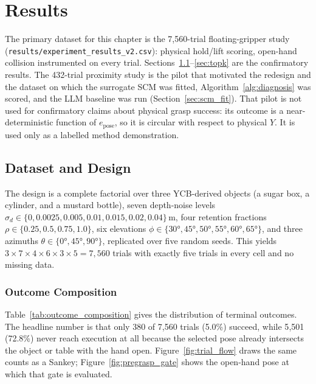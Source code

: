 \documentclass[11pt,a4paper]{report}
\begin{document}
\chapter{Results}
\label{ch:results}

The primary dataset for this chapter is the 7{,}560-trial floating-gripper study (\texttt{results/experiment\_results\_v2.csv}): physical hold/lift scoring, open-hand collision instrumented on every trial. Sections~\ref{sec:descriptive}--\ref{sec:topk} are the confirmatory results. The 432-trial proximity study is the pilot that motivated the redesign and the dataset on which the surrogate SCM was fitted, Algorithm~\ref{alg:diagnosis} was scored, and the LLM baseline was run (Section~\ref{sec:scm_fit}). That pilot is not used for confirmatory claims about physical grasp success: its outcome is a near-deterministic function of $e_{\text{pose}}$, so it is circular with respect to physical $Y$. It is used only as a labelled method demonstration.

\section{Dataset and Design}
\label{sec:descriptive}

The design is a complete factorial over three YCB-derived objects (a sugar box, a cylinder, and a mustard bottle), seven depth-noise levels $\sigma_d \in \{0, 0.0025, 0.005, 0.01, 0.015, 0.02, 0.04\}$\,m, four retention fractions $\rho \in \{0.25, 0.5, 0.75, 1.0\}$, six elevations $\phi \in \{30°, 45°, 50°, 55°, 60°, 65°\}$, and three azimuths $\theta \in \{0°, 45°, 90°\}$, replicated over five random seeds. This yields $3 \times 7 \times 4 \times 6 \times 3 \times 5 = 7{,}560$ trials with exactly five trials in every cell and no missing data.

\subsection{Outcome Composition}

Table~\ref{tab:outcome_composition} gives the distribution of terminal outcomes. The headline number is that only 380 of 7{,}560 trials (5.0\%) succeed, while 5{,}501 (72.8\%) never reach execution at all because the selected pose already intersects the object or table with the hand open. Figure~\ref{fig:trial_flow} draws the same counts as a Sankey; Figure~\ref{fig:pregrasp_gate} shows the open-hand pose at which that gate is evaluated.
\end{document}
